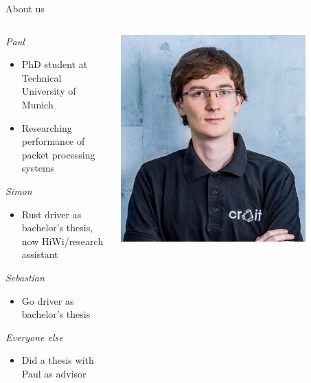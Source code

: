 \documentclass[NET,english,aspectratio=169,notitleframe,draft]{tumbeamer}
\begin{document}
\begin{frame}{About us}
\begin{columns}
\begin{column}{0.8\textwidth}
\emph{Paul}
\begin{itemize}
\item PhD student at Technical University of Munich
\item Researching performance of packet processing systems
\end{itemize}
\vfill
\emph{Simon}
\begin{itemize}
\item Rust driver as bachelor's thesis, now HiWi/research assistant
\end{itemize}
\emph{Sebastian}
\begin{itemize}
\item Go driver as bachelor's thesis
\end{itemize}
\emph{Everyone else}
\begin{itemize}
\item Did a thesis with Paul as advisor
\end{itemize}
\end{column}
\begin{column}{0.15\textwidth}
\includegraphics[width=0.8\textwidth]{pics/paul.jpg}\\

\end{column}
\end{columns}
\end{frame}
\end{document}
